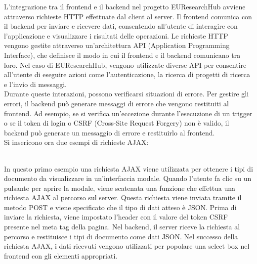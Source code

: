 \documentclass{report}
\begin{document}
L'integrazione tra il frontend e il backend nel progetto EUResearchHub avviene attraverso richieste HTTP effettuate dal client al server. Il frontend comunica con il backend per inviare e ricevere dati, consentendo all'utente di interagire con l'applicazione e visualizzare i risultati delle operazioni. Le richieste HTTP vengono gestite attraverso un'architettura API (Application Programming Interface), che definisce il modo in cui il frontend e il backend comunicano tra loro. Nel caso di EUResearchHub, vengono utilizzate diverse API per consentire all'utente di eseguire azioni come l'autenticazione, la ricerca di progetti di ricerca e l'invio di messaggi.\\
Durante queste interazioni, possono verificarsi situazioni di errore. Per gestire gli errori, il backend può generare messaggi di errore che vengono restituiti al frontend. Ad esempio, se si verifica un'eccezione durante l'esecuzione di un trigger o se il token di login o CSRF (Cross-Site Request Forgery) non è valido, il backend può generare un messaggio di errore e restituirlo al frontend. \\
Si insericono ora due esempi di richieste AJAX:\\
\begin{minipage}{\linewidth}
\end{minipage}\\
In questo primo esempio una richiesta AJAX viene utilizzata per ottenere i tipi di documento da visualizzare in un'interfaccia modale. Quando l'utente fa clic su un pulsante per aprire la modale, viene scatenata una funzione che effettua una richiesta AJAX al percorso  sul server. Questa richiesta viene inviata tramite il metodo POST e viene specificato che il tipo di dati atteso è JSON. Prima di inviare la richiesta, viene impostato l'header  con il valore del token CSRF presente nel meta tag della pagina.
Nel backend, il server riceve la richiesta al percorso  e restituisce i tipi di documento come dati JSON. Nel successo della richiesta AJAX, i dati ricevuti vengono utilizzati per popolare una select box nel frontend con gli elementi appropriati.\\
\end{document}
